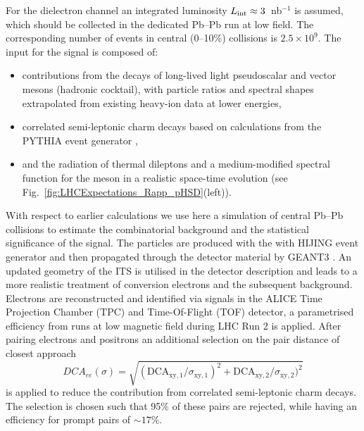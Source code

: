 \documentclass[../report.tex]{subfiles}
\begin{document}
For the dielectron channel an integrated luminosity $L_{\rm int}\approx 3$~nb$^{−1}$ is assumed, which should be collected in the dedicated Pb--Pb run at low field. The corresponding number of events in central (0--10\%) collisions is $2.5 \times 10^{9}$.  
The input for the signal is composed of:
\begin{itemize}
\item contributions from the decays of long-lived light pseudoscalar and vector mesons (hadronic cocktail), with particle ratios and spectral shapes extrapolated from existing heavy-ion data at lower energies,
\item correlated semi-leptonic charm decays based on calculations from the PYTHIA event generator \cite{},
\item and the radiation of thermal dileptons and a medium-modified spectral function for the \Prho meson in a realistic space-time evolution (see Fig.~\ref{fig:LHCExpectations_Rapp_pHSD}(left)).
\end{itemize}
With respect to earlier calculations \cite{Abelevetal:2014cna,Abelevetal:2014dna,ALICE:2014qrd} we use here a  simulation of central Pb--Pb collisions to estimate the combinatorial background and the statistical significance of the signal. The particles are produced with the with HIJING \cite{} event generator and then propagated through the detector material by GEANT3 \cite{}. An updated geometry of the ITS is utilised in the detector description and leads to a more realistic treatment of conversion electrons and the subsequent background. 
Electrons are reconstructed and identified via signals in the ALICE Time Projection Chamber (TPC) and Time-Of-Flight (TOF) detector, a parametrised efficiency from runs at low magnetic field during LHC Run 2 is applied. After pairing electrons and positrons an additional selection on the pair distance of closest approach 
\begin{equation}
DCA_{ee}(\sigma)=\sqrt{(\mathrm{DCA}_{\mathrm{xy},1}/\sigma_{\mathrm{xy},1})^2+\mathrm{DCA}_{\mathrm{xy},2}/\sigma_{\mathrm{xy},2})^2}
\end{equation}
is applied to reduce the contribution from correlated semi-leptonic charm decays. The selection is chosen such that 95\% of these pairs are rejected, while having an efficiency for prompt pairs of $\sim17$\%.
\end{document}

